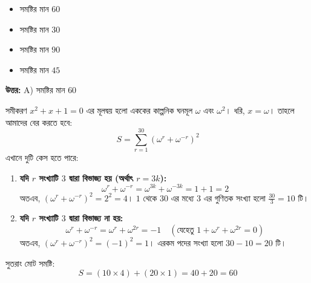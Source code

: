 \documentclass[12pt, a4paper]{article}
\begin{document}
\begin{itemize}[label={}, leftmargin=1cm, itemsep=0.5em]
    \item[\textbf{A)}] সমষ্টির মান $60$
    \item[\textbf{B)}] সমষ্টির মান $30$
    \item[\textbf{C)}] সমষ্টির মান $90$
    \item[\textbf{D)}] সমষ্টির মান $45$
\end{itemize}

\vspace{0.5em}
\begin{tcolorbox}[answerbox]
    \textbf{\color{success} উত্তর:} A) সমষ্টির মান $60$
\end{tcolorbox}
\vspace{1em}

\begin{tcolorbox}[solutionbox={সমাধান (Solution)}]
    \noindent
    সমীকরণ $x^2 + x + 1 = 0$ এর মূলদ্বয় হলো এককের কাল্পনিক ঘনমূল $\omega$ এবং $\omega^2$। 
    ধরি, $x = \omega$। তাহলে আমাদের বের করতে হবে:
    \[ S = \sum_{r=1}^{30} \left(\omega^r + \omega^{-r}\right)^2 \]
    এখানে দুটি কেস হতে পারে:
    
    \vspace{0.5em}
    \begin{enumerate}[itemsep=0.4em]
        \item \textbf{যদি $r$ সংখ্যাটি $3$ দ্বারা বিভাজ্য হয় (অর্থাৎ $r = 3k$):} \\
        \[ \omega^r + \omega^{-r} = \omega^{3k} + \omega^{-3k} = 1 + 1 = 2 \]
        অতএব, $(\omega^r + \omega^{-r})^2 = 2^2 = 4$। 
        $1$ থেকে $30$ এর মধ্যে $3$ এর গুণিতক সংখ্যা হলো $\frac{30}{3} = 10$ টি।
        
        \item \textbf{যদি $r$ সংখ্যাটি $3$ দ্বারা বিভাজ্য না হয়:} \\
        \[ \omega^r + \omega^{-r} = \omega^r + \omega^{2r} = -1 \quad (\text{যেহেতু } 1 + \omega^r + \omega^{2r} = 0) \]
        অতএব, $(\omega^r + \omega^{-r})^2 = (-1)^2 = 1$। 
        এরকম পদের সংখ্যা হলো $30 - 10 = 20$ টি।
    \end{enumerate}
    
    \vspace{0.5em}
    সুতরাং মোট সমষ্টি:
    \[ S = (10 \times 4) + (20 \times 1) = 40 + 20 = 60 \]
\end{tcolorbox}
\end{document}

